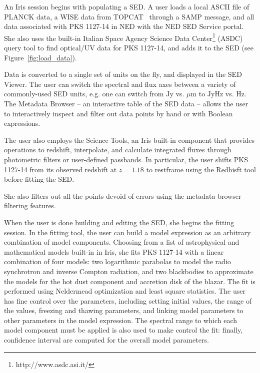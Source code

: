 \documentclass[5p]{elsarticle}
\begin{document}
An Iris session begins with populating a SED. A user loads a local ASCII file of PLANCK data, a WISE data from TOPCAT~\citep{2005ASPC..347...29T} through a SAMP message, and all data associated with PKS 1127-14 in NED with the NED SED Service portal. She also uses the built-in Italian Space Agency Science Data Center\footnote{http://www.asdc.asi.it/} (ASDC) query tool to find optical/UV data for PKS 1127-14, and adds it to the SED (see Figure~\ref{fig:load_data}).

Data is converted to a single set of units on the fly, and displayed in the SED Viewer. The user can switch the spectral and flux axes between a variety of commonly-used SED units, e.g. one can switch from $\mathrm{Jy}$ vs. ${\mu}\mathrm{m}$ to $\mathrm{Jy}\mathrm{Hz}$ vs. $\mathrm{Hz}$. The Metadata Browser -- an interactive table of the SED data -- allows the user to interactively inspect and filter out data points by hand or with Boolean expressions.

The user also employs the Science Tools, an Iris built-in component that provides operations to redshift, interpolate, and calculate integrated fluxes through photometric filters or user-defined passbands. In particular, the user shifts PKS 1127-14 from its observed redshift at $z=1.18$ to restframe using the Redhisft tool before fitting the SED.

She also filters out all the points devoid of errors using the metadata browser filtering features.

When the user is done building and editing the SED, she begins the fitting session. In the fitting tool, the user can build a model expression as an arbitrary combination of model components. Choosing from a list of astrophysical and mathematical models built-in in Iris, she fits PKS 1127-14 with a linear combination of four models: two logarithmic parabolas to model the radio synchrotron and inverse Compton radiation, and two blackbodies to approximate the models for the hot dust component and accretion disk of the blazar. The fit is performed using Neldermead optimization and least square statistics. The user has fine control over the parameters, including setting initial values, the range of the values, freezing and thawing parameters, and linking model parameters to other parameters in the model expression. The spectral range to which each model component must be applied is also used to make control the fit: finally, confidence interval are computed for the overall model parameters.
\end{document}
